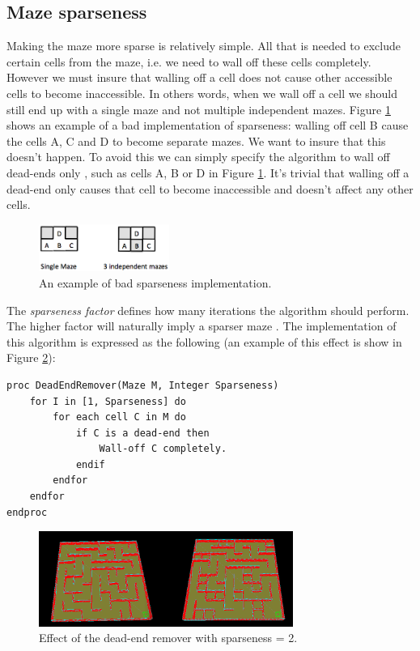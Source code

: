 \subsection{Maze sparseness}
Making the maze more sparse is relatively simple. All that is needed to exclude certain cells from the maze, i.e. we need to wall off these cells completely. However we must insure that walling off a cell does not cause other accessible cells to become inaccessible. In others words, when we wall off a cell we should still end up with a single maze and not multiple independent mazes. Figure \ref{abcd-sparseness} shows an example of a bad implementation of sparseness: walling off cell B cause the cells A, C and D to become separate mazes. We want to insure that this doesn't happen. To avoid this we can simply specify the algorithm to wall off dead-ends only \citep{JBuck}, such as cells A, B or D in Figure \ref{abcd-sparseness}. It's trivial that walling off a dead-end only causes that cell to become inaccessible and doesn't affect any other cells.

\begin{figure}[h!]
\centering
 \includegraphics[width=0.38\textwidth]{images/abcd_sparseness.png}
\caption{An example of bad sparseness implementation.}
\label{abcd-sparseness}
\end{figure}

The {\em sparseness factor} defines how many iterations the algorithm should perform. The higher factor will naturally imply a sparser maze \citep{JBuck}. The implementation of this algorithm is expressed as the following (an example of this effect is show in Figure \ref{sparseness2}):

\lstAlgo
\begin{lstlisting}
proc DeadEndRemover(Maze M, Integer Sparseness)
	for I in [1, Sparseness] do
		for each cell C in M do
			if C is a dead-end then
				Wall-off C completely.
			endif
		endfor
	endfor
endproc
\end{lstlisting}

\begin{figure}[h!]
\centering
 \includegraphics[width=0.74\textwidth]{images/DeadEndDigger-sparse2.png}
\caption{Effect of the dead-end remover with sparseness = 2.}
\label{sparseness2}
\end{figure}

